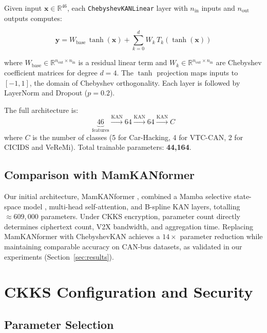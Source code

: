 \documentclass[conference]{IEEEtran}
\begin{document}
Given input $\mathbf{x} \in \mathbb{R}^{46}$, each
\texttt{ChebyshevKANLinear} layer with $n_{\mathrm{in}}$ inputs and
$n_{\mathrm{out}}$ outputs computes:

\begin{equation}
  \mathbf{y} = W_{\mathrm{base}}\,\tanh(\mathbf{x}) +
               \sum_{k=0}^{d} W_k\, T_k(\tanh(\mathbf{x}))
  \label{eq:kanlayer}
\end{equation}

\noindent where $W_{\mathrm{base}} \in \mathbb{R}^{n_{\mathrm{out}} \times n_{\mathrm{in}}}$
is a residual linear term and $W_k \in \mathbb{R}^{n_{\mathrm{out}} \times n_{\mathrm{in}}}$
are Chebyshev coefficient matrices for degree $d{=}4$. The $\tanh$ projection
maps inputs to $[-1,1]$, the domain of Chebyshev orthogonality. Each layer
is followed by LayerNorm and Dropout ($p{=}0.2$).

The full architecture is:
\[
  \underbrace{46}_{\text{features}} \xrightarrow{\text{KAN}} 64
  \xrightarrow{\text{KAN}} 64 \xrightarrow{\text{KAN}} C
\]
where $C$ is the number of classes (5 for Car-Hacking, 4 for VTC-CAN,
2 for CICIDS and VeReMi). Total trainable parameters: \textbf{44,164}.

\subsection{Comparison with MamKANformer}

Our initial architecture, MamKANformer \cite{generation1report}, combined
a Mamba selective state-space model \cite{gu2023mamba}, multi-head
self-attention, and B-spline KAN layers, totalling ${\approx}609{,}000$
parameters. Under CKKS encryption, parameter count directly determines
ciphertext count, V2X bandwidth, and aggregation time. Replacing
MamKANformer with ChebyshevKAN achieves a $14\times$ parameter reduction
while maintaining comparable accuracy on CAN-bus datasets, as validated in
our experiments (Section~\ref{sec:results}).

\section{CKKS Configuration and Security}
\label{sec:ckks}

\subsection{Parameter Selection}
\end{document}

